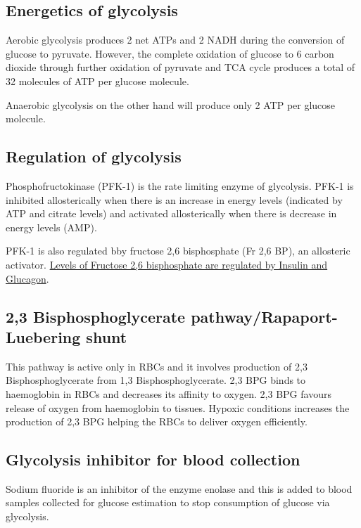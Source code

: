 \documentclass[
]{book}
\begin{document}
\subsection{Energetics of glycolysis}\label{energetics-of-glycolysis}

Aerobic glycolysis produces 2 net ATPs and 2 NADH during the conversion of glucose to pyruvate. However, the complete oxidation of glucose to 6 carbon dioxide through further oxidation of pyruvate and TCA cycle produces a total of 32 molecules of ATP per glucose molecule.

Anaerobic glycolysis on the other hand will produce only 2 ATP per glucose molecule.

\subsection{Regulation of glycolysis}\label{regulation-of-glycolysis}

Phosphofructokinase (PFK-1) is the rate limiting enzyme of glycolysis. PFK-1 is inhibited allosterically when there is an increase in energy levels (indicated by ATP and citrate levels) and activated allosterically when there is decrease in energy levels (AMP).

PFK-1 is also regulated bby fructose 2,6 bisphosphate (Fr 2,6 BP), an allosteric activator. \hyperref[regulation-of-glycolysis-and-gluconeogenesis]{Levels of Fructose 2,6 bisphosphate are regulated by Insulin and Glucagon}.

\subsection{2,3 Bisphosphoglycerate pathway/Rapaport- Luebering shunt}\label{bisphosphoglycerate-pathwayrapaport--luebering-shunt}

This pathway is active only in RBCs and it involves production of 2,3 Bisphosphoglycerate from 1,3 Bisphosphoglycerate. 2,3 BPG binds to haemoglobin in RBCs and decreases its affinity to oxygen. 2,3 BPG favours release of oxygen from haemoglobin to tissues. Hypoxic conditions increases the production of 2,3 BPG helping the RBCs to deliver oxygen efficiently.

\subsection{Glycolysis inhibitor for blood collection}\label{glycolysis-inhibitor-for-blood-collection}

Sodium fluoride is an inhibitor of the enzyme enolase and this is added to blood samples collected for glucose estimation to stop consumption of glucose via glycolysis.
\end{document}
